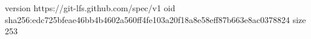 version https://git-lfs.github.com/spec/v1
oid sha256:edc725bfeae46bb4b4602a560ff4fe103a20f18a8e58eff87b663e8ac0378824
size 253
